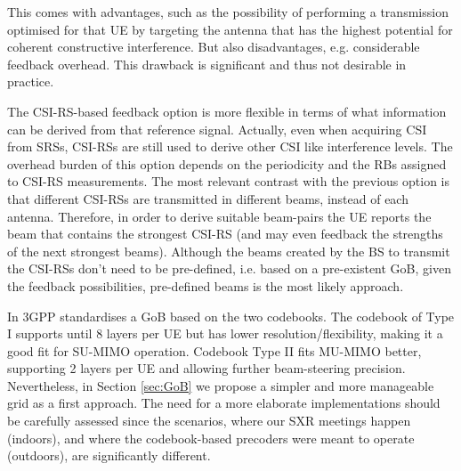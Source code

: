 This comes with advantages, such as the possibility of performing a transmission optimised for that UE by targeting the antenna that has the highest potential for coherent constructive interference. But also disadvantages, e.g. considerable feedback overhead. This drawback is significant and thus not desirable in practice.



The CSI-RS-based feedback option is more flexible in terms of what information can be derived from that reference signal. Actually, even when acquiring CSI from SRSs, CSI-RSs are still used to derive other CSI like interference levels. The overhead burden of this option depends on the periodicity and the \acp{RB} assigned to CSI-RS measurements. The most relevant contrast with the previous option is that different CSI-RSs are transmitted in different beams, instead of each antenna. Therefore, in order to derive suitable beam-pairs the UE reports the beam that contains the strongest CSI-RS (and may even feedback the strengths of the next strongest beams). Although the beams created by the BS to transmit the CSI-RSs don't need to be pre-defined, i.e. based on a pre-existent GoB, given the feedback possibilities, pre-defined beams is the most likely approach.


In \cite{3gpp-codebooks} 3GPP standardises a GoB based on the two codebooks. The codebook of Type I supports until 8 layers per UE but has lower resolution/flexibility, making it a good fit for SU-MIMO operation. Codebook Type II fits MU-MIMO better, supporting 2 layers per UE and allowing further beam-steering precision. 
Nevertheless, in Section \ref{sec:GoB} we propose a simpler and more manageable grid as a first approach. The need for a more elaborate implementations should be carefully assessed since the scenarios, where our SXR meetings happen (indoors), and where the codebook-based precoders were meant to operate (outdoors), are significantly different.







